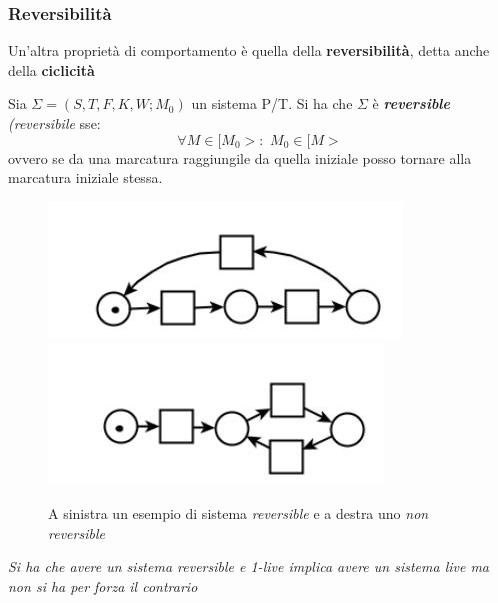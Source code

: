 \documentclass[a4paper,12pt, oneside]{book}
\begin{document}
\subsubsection{Reversibilità}
Un'altra proprietà di comportamento è quella della \textbf{reversibilità}, detta
anche della \textbf{ciclicità}
\begin{definizione}
  Sia $\Sigma=(S,T,F,K,W;M_0)$ un sistema P/T. Si ha che $\Sigma$ è
  \textit{\textbf{reversible} (reversibile} sse:
  \[\forall M\in[M_0>:\,\,M_0\in[M>\]
  ovvero se da una marcatura raggiungile da quella iniziale posso tornare alla
  marcatura iniziale stessa.\\
  \begin{figure}[H]
    \includegraphics[scale = 0.55]{img/ptc10.jpg}
    ~
    \includegraphics[scale = 0.55]{img/ptc1.jpg}
    \caption{A sinistra un esempio di sistema \emph{reversible} e a destra uno
      \emph{non reversible}} 
  \end{figure}
  \textit{Si ha che avere un sistema \emph{reversible} e \emph{1-live} implica
    avere un sistema \emph{live} ma non si ha per forza il contrario}
\end{definizione}
\end{document}
